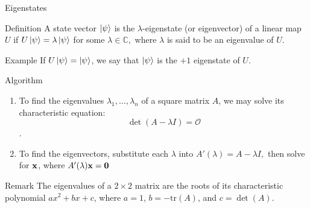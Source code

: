 \documentclass{beamer}
\newcommand{\C}{\mathbb{C}}
\newcommand{\tr}{\text{tr}}
\renewcommand{\O}{\mathcal O}
\renewcommand{\vec}{\textbf}
\begin{document}
\begin{frame}{Eigenstates}
\begin{block}{Definition}
A state vector $\ket\psi$ is the $\lambda$-eigenstate (or eigenvector) of a linear map $U$ if $U\ket\psi = \lambda \ket\psi$ for some $\lambda \in \C,$ where $\lambda$ is said to be an eigenvalue of $U$.
\end{block}

\begin{block}{Example}
If $U\ket\psi = \ket\psi$, we say that $\ket\psi$ is the $+1$ eigenstate of $U$.
\end{block}

\end{frame}

\begin{frame}
\begin{block}{Algorithm}
\begin{enumerate}
\item To find the eigenvalues $\lambda_1,\ldots,\lambda_n$ of a square matrix $A$, we may solve its characteristic equation: $$ \det(A - \lambda I) = \O $$.
\item To find the eigenvectors, substitute each $\lambda$ into $A'(\lambda)=A-\lambda I,$ then solve for $\vec x$, where $A'(\lambda)\vec x = \vec 0$
\end{enumerate}
\end{block}

\begin{block}{Remark}
The eigenvalues of a $2\times2$ matrix are the roots of its characteristic polynomial $ax^2 + bx + c$, where $a = 1$, $b = -\tr(A)$, and $c=\det(A)$.
\end{block}

\end{frame}
\end{document}
